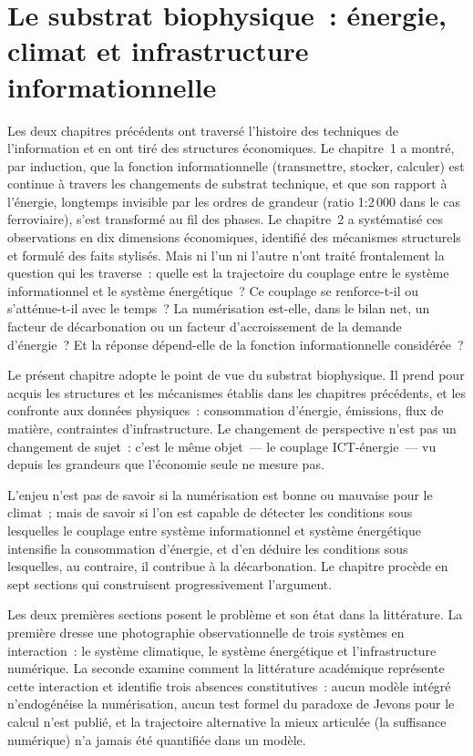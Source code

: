 \chapter{Le substrat biophysique~: énergie, climat et infrastructure informationnelle}\label{ch:energy}

Les deux chapitres précédents ont traversé l'histoire des techniques de l'information et en ont tiré des structures économiques. Le chapitre~1 a montré, par induction, que la fonction informationnelle (transmettre, stocker, calculer) est continue à travers les changements de substrat technique, et que son rapport à l'énergie, longtemps invisible par les ordres de grandeur (ratio 1:2\,000 dans le cas ferroviaire), s'est transformé au fil des phases. Le chapitre~2 a systématisé ces observations en dix dimensions économiques, identifié des mécanismes structurels et formulé des faits stylisés. Mais ni l'un ni l'autre n'ont traité frontalement la question qui les traverse~: quelle est la trajectoire du couplage entre le système informationnel et le système énergétique~? Ce couplage se renforce-t-il ou s'atténue-t-il avec le temps~? La numérisation est-elle, dans le bilan net, un facteur de décarbonation ou un facteur d'accroissement de la demande d'énergie~? Et la réponse dépend-elle de la fonction informationnelle considérée~?

Le présent chapitre adopte le point de vue du substrat biophysique. Il prend pour acquis les structures et les mécanismes établis dans les chapitres précédents, et les confronte aux données physiques~: consommation d'énergie, émissions, flux de matière, contraintes d'infrastructure. Le changement de perspective n'est pas un changement de sujet~: c'est le même objet~--- le couplage ICT-énergie~--- vu depuis les grandeurs que l'économie seule ne mesure pas.

L'enjeu n'est pas de savoir si la numérisation est bonne ou mauvaise pour le climat~; mais de savoir si l'on est capable de détecter les conditions sous lesquelles le couplage entre système informationnel et système énergétique intensifie la consommation d'énergie, et d'en déduire les conditions sous lesquelles, au contraire, il contribue à la décarbonation. Le chapitre procède en sept sections qui construisent progressivement l'argument.

Les deux premières sections posent le problème et son état dans la littérature. La première dresse une photographie observationnelle de trois systèmes en interaction~: le système climatique, le système énergétique et l'infrastructure numérique. La seconde examine comment la littérature académique représente cette interaction et identifie trois absences constitutives~: aucun modèle intégré n'endogénéise la numérisation, aucun test formel du paradoxe de Jevons pour le calcul n'est publié, et la trajectoire alternative la mieux articulée (la suffisance numérique) n'a jamais été quantifiée dans un modèle.

